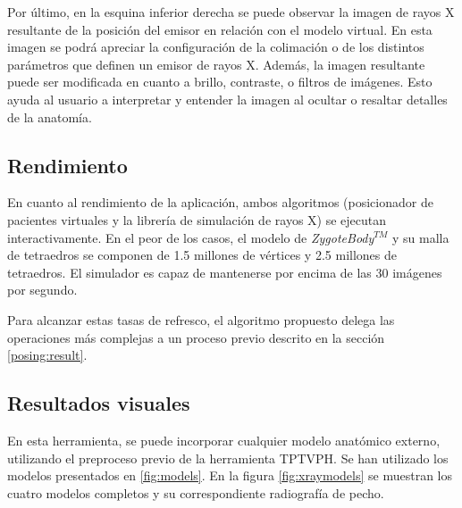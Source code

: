 Por último, en la esquina inferior derecha se puede observar la imagen de rayos X resultante de la posición del emisor en relación con el modelo virtual. En esta imagen se podrá apreciar la configuración de la colimación o de los distintos parámetros que definen un emisor de rayos X. Además, la imagen resultante puede ser modificada en cuanto a brillo, contraste, o filtros de imágenes. Esto ayuda al usuario a interpretar y entender la imagen al ocultar o resaltar detalles de la anatomía.

\subsection{Rendimiento}
En cuanto al rendimiento de la aplicación, ambos algoritmos (posicionador de pacientes virtuales y la librería de simulación de rayos X) se ejecutan interactivamente. En el peor de los casos, el modelo de \emph{ZygoteBody}$^{TM}$ y su malla de tetraedros se componen de 1.5 millones de vértices y 2.5 millones de tetraedros. El simulador es capaz de mantenerse por encima de las 30 imágenes por segundo. 

Para alcanzar estas tasas de refresco, el algoritmo propuesto delega las operaciones más complejas a un proceso previo descrito en la sección \ref{posing:result}.


\subsection{Resultados visuales}

En esta herramienta, se puede incorporar cualquier modelo anatómico externo, utilizando el preproceso previo de la herramienta \ac{TPTVPH}. Se han utilizado los modelos presentados en \ref{fig:models}. En la figura \ref{fig:xraymodels} se muestran los cuatro modelos completos y su correspondiente radiografía de pecho.



